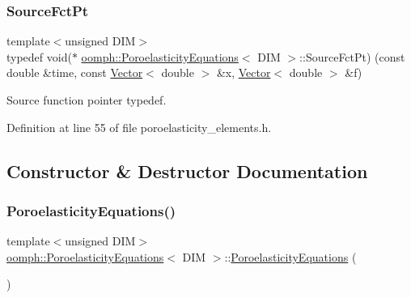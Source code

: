 \mbox{\label{classoomph_1_1PoroelasticityEquations_a234bc29fbd4c3255ef903a3cb5f6361f}} 
\subsubsection{\texorpdfstring{Source\+Fct\+Pt}{SourceFctPt}}
{\footnotesize\ttfamily template$<$unsigned D\+IM$>$ \\
typedef void($\ast$ \hyperlink{classoomph_1_1PoroelasticityEquations}{oomph\+::\+Poroelasticity\+Equations}$<$ D\+IM $>$\+::Source\+Fct\+Pt) (const double \&time, const \hyperlink{classoomph_1_1Vector}{Vector}$<$ double $>$ \&x, \hyperlink{classoomph_1_1Vector}{Vector}$<$ double $>$ \&f)}



Source function pointer typedef. 



Definition at line 55 of file poroelasticity\+\_\+elements.\+h.



\subsection{Constructor \& Destructor Documentation}
\mbox{\label{classoomph_1_1PoroelasticityEquations_aaed6a78df898d4b52f5da3454eed8267}} 
\subsubsection{\texorpdfstring{Poroelasticity\+Equations()}{PoroelasticityEquations()}}
{\footnotesize\ttfamily template$<$unsigned D\+IM$>$ \\
\hyperlink{classoomph_1_1PoroelasticityEquations}{oomph\+::\+Poroelasticity\+Equations}$<$ D\+IM $>$\+::\hyperlink{classoomph_1_1PoroelasticityEquations}{Poroelasticity\+Equations} (\begin{DoxyParamCaption}{ }\end{DoxyParamCaption})\hspace{0.3cm}{\ttfamily [inline]}}




